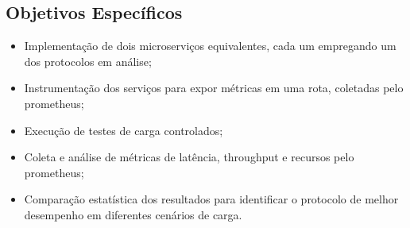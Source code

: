 \subsection{Objetivos Específicos}
\begin{itemize}
    \item Implementação de dois microserviços equivalentes, cada um empregando um dos protocolos em análise; 
    
    \item Instrumentação dos serviços para expor métricas em uma rota, coletadas pelo prometheus; 
    
    \item Execução de testes de carga controlados; 
    
    \item Coleta e análise de métricas de latência, throughput e recursos pelo prometheus; 

    \item Comparação estatística dos resultados para identificar o protocolo de melhor desempenho em diferentes cenários de carga.     

\end{itemize}











